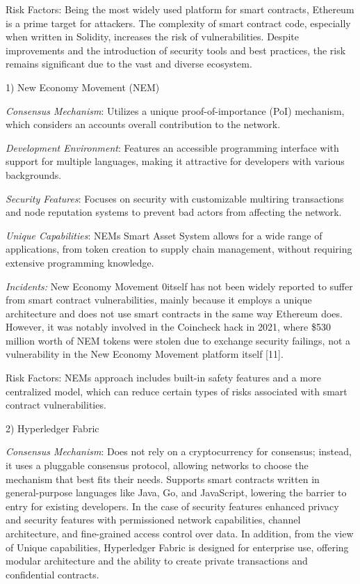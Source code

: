 \begin{multicols}{2}
Risk Factors: Being the most widely used platform for smart contracts,
Ethereum is a prime target for attackers. The complexity of smart
contract code, especially when written in Solidity, increases the risk
of vulnerabilities. Despite improvements and the introduction of
security tools and best practices, the risk remains significant due to
the vast and diverse ecosystem.

1) New Economy Movement (NEM)

\emph{Consensus Mechanism}: Utilizes a unique proof-of-importance (PoI)
mechanism, which considers an account\textquotesingle s overall
contribution to the network.

\emph{Development Environment}: Features an accessible programming
interface with support for multiple languages, making it attractive for
developers with various backgrounds.

\emph{Security Features}: Focuses on security with customizable
multiring transactions and node reputation systems to prevent bad actors
from affecting the network.

\emph{Unique Capabilities}: NEM\textquotesingle s Smart Asset System
allows for a wide range of applications, from token creation to supply
chain management, without requiring extensive programming knowledge.

\emph{Incidents:} New Economy Movement 0itself has not been widely
reported to suffer from smart contract vulnerabilities, mainly because
it employs a unique architecture and does not use smart contracts in the
same way Ethereum does. However, it was notably involved in the
Coincheck hack in 2021, where \$530 million worth of NEM tokens were
stolen due to exchange security failings, not a vulnerability in the New
Economy Movement platform itself {[}11{]}.

Risk Factors: NEM\textquotesingle s approach includes built-in safety
features and a more centralized model, which can reduce certain types of
risks associated with smart contract vulnerabilities.

2) Hyperledger Fabric

\emph{Consensus Mechanism}: Does not rely on a cryptocurrency for
consensus; instead, it uses a pluggable consensus protocol, allowing
networks to choose the mechanism that best fits their needs. Supports
smart contracts written in general-purpose languages like Java, Go, and
JavaScript, lowering the barrier to entry for existing developers. In
the case of security features enhanced privacy and security features
with permissioned network capabilities, channel architecture, and
fine-grained access control over data. In addition, from the view of
Unique capabilities, Hyperledger Fabric is designed for enterprise use,
offering modular architecture and the ability to create private
transactions and confidential contracts.


\end{multicols}
